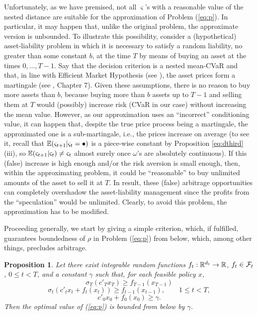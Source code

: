 \documentclass{article}              %
\newtheorem{proposition}{Proposition}
\begin{document}
Unfortunately, as we have premised, not all $\varsigma$'s with a reasonable value of the nested distance
are suitable for the approximation of Problem (\ref{eq:p}). In particular,
it may happen that, unlike the original problem, the approximate
version is unbounded. To illustrate this possibility, consider a (hypothetical)
asset-liability problem in which it is necessary to satisfy a random 
liability, no greater than some constant $b$, at the time $T$ by means of buying an asset at the times
$0,\dots,T-1$. Say that the decision criterion is a nested mean-CVaR and that, in line with Efficient Market Hypothesis (see \cite{Cuthbertson97}), the asset prices form a martingale (see \cite{Kallenberg02}, Chapter 7). Given these assumptions, there is no reason to buy more assets than $b$, because buying more than $b$ assets up to $T-1$ and selling them at $T$ would (possibly) increase
risk (CVaR in our case) without increasing the mean value. However, as our approximation uses an ``incorrect'' conditioning value, it can happen that, despite the true price process being a martingale, the approximated one is a sub-martingale, i.e., the prices increase on average (to see it, recall that $\mathbb{E}(\varsigma_{t+1}|\varsigma_t=\bullet)$
is a piece-wise constant by Proposition \ref{eq:dthird} (iii), so $\mathbb{E}(\varsigma_{t+1}|\varsigma_{t})\neq\varsigma_{t}$
almost surely once $\omega$'s are absolutely continuous). If this (false) increase is high enough and/or the risk aversion is small enough, then, within the approximating problem, it could be ``reasonable'' to buy unlimited amounts of the asset to sell it at $T$. In result, these (false) arbitrage opportunities can completely overshadow the asset-liability
management since the profits from the ``speculation'' would be unlimited. Clearly, to avoid this problem, the approximation has to be modified.

Proceeding generally, we start by giving a simple criterion, which,
if fulfilled, guarantees boundedness of $\rho$ in Problem (\ref{eq:p})
from below, which, among other things, precludes arbitrage.

\begin{proposition}
\label{cor:feas} Let there exist integrable random functions $f_{t}:\mathbb{R}^{d_{t}}\rightarrow\mathbb{R}$, $f_t \in \mathcal{F}_t$,
$0\leq t<T$, and a constant $\gamma$ such that, for each feasible
policy $x$, 
\begin{equation}\label{eq:f1}
\sigma_T(c'{}_{T}x_{T})\geq f_{T-1}(x_{T-1})
\end{equation}
\begin{equation}\label{eq:f2}
\sigma_t(c'{}_{t}x_{t}+f_{t}(x_{t}))\geq f_{t-1}(x_{t-1}),\qquad1\leq t< T,
\end{equation}
\begin{equation}\label{eq:f3}
c'_{0}x_{0}+f_{0}(x_{0})\geq\gamma.
\end{equation}
Then the optimal value of (\ref{eq:p}) is bounded from below by $\gamma$.

\end{proposition}
\end{document}

